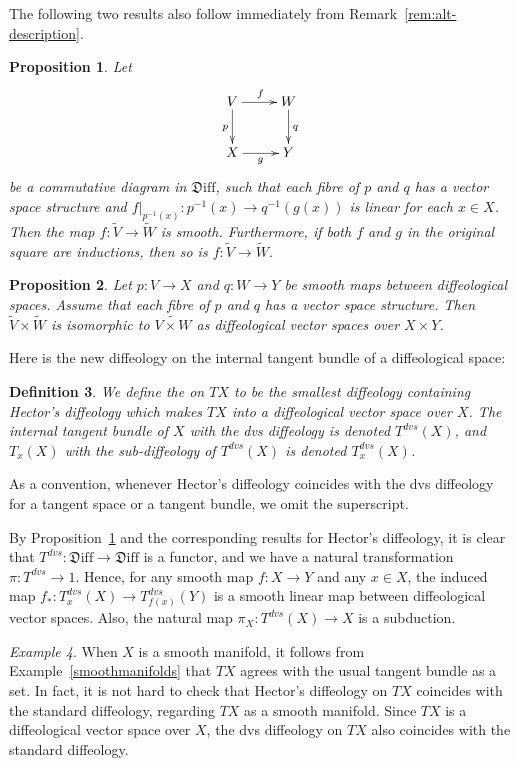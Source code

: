 \documentclass{amsart}
\newcommand{\dfn}[1]{\textbf{\boldmath{#1}}}
\newtheorem{de}{Definition}[section]
\newtheorem{prop}[de]{Proposition}
\theoremstyle{remark}
\newtheorem{ex}[de]{Example}
\newcommand{\ra}{\to}
\newcommand{\Diff}{{\mathfrak{D}\mathrm{iff}}}
\begin{document}
The following two results also follow immediately from Remark~\ref{rem:alt-description}.

\begin{prop}\label{prop:Hectortodvs}
Let
\[
\xymatrix{V \ar[r]^f \ar[d]_p & W \ar[d]^q \\ X \ar[r]_g & Y}
\]
be a commutative diagram in $\Diff$, such that each fibre of $p$ and $q$
has a vector space structure and $f|_{p^{-1}(x)}:p^{-1}(x) \ra q^{-1}(g(x))$
is linear for each $x \in X$.
Then the map $f: \widetilde{V} \ra \widetilde{W}$ is smooth.
Furthermore, if both $f$ and $g$ in the original square are inductions,
then so is $f: \widetilde{V} \ra \widetilde{W}$.
\end{prop}

\begin{prop}\label{pr:dvs-product}
Let $p:V \ra X$ and $q:W \ra Y$ be smooth maps between diffeological spaces.
Assume that each fibre of $p$ and $q$ has a vector space structure.
Then $\widetilde{V} \times \widetilde{W}$ is isomorphic to
$\widetilde{V \times W}$ as diffeological vector spaces over $X \times Y$.
\end{prop}

Here is the new diffeology on the internal tangent bundle of a diffeological space:

\begin{de}\label{def:dvsdiffeology}
We define the \dfn{dvs diffeology} on $TX$ to be the smallest diffeology containing
Hector's diffeology which makes $TX$ into a diffeological vector space over $X$.
The internal tangent bundle of $X$ with the dvs diffeology is denoted $T^{dvs}(X)$,
and $T_x(X)$ with the sub-diffeology of $T^{dvs}(X)$ is denoted $T_x^{dvs}(X)$.
\end{de}

As a convention, whenever Hector's diffeology coincides with the dvs diffeology
for a tangent space or a tangent bundle, we omit the superscript.

\smallskip

By Proposition~\ref{prop:Hectortodvs} and
the corresponding results for Hector's diffeology,
it is clear that $T^{dvs}:\Diff \ra \Diff$ is a functor,
and we have a natural transformation $\pi:T^{dvs} \ra 1$.
Hence, for any smooth map $f:X \ra Y$ and any $x \in X$,
the induced map $f_*: T_x^{dvs}(X) \ra T_{f(x)}^{dvs}(Y)$
is a smooth linear map between diffeological vector spaces.
Also, the natural map $\pi_X:T^{dvs}(X) \ra X$ is a subduction.

\begin{ex}
When $X$ is a smooth manifold, it follows from Example~\ref{smoothmanifolds} that
$TX$ agrees with the usual tangent bundle as a set.
In fact, it is not hard to check that
Hector's diffeology on $TX$ coincides with the standard diffeology,
regarding $TX$ as a smooth manifold.
Since $TX$ is a diffeological vector space over $X$,
the dvs diffeology on $TX$ also coincides with the standard diffeology.
\end{ex}
\end{document}
